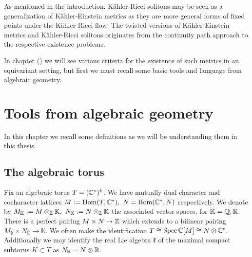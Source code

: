 As mentioned in the introduction, K\"ahler-Ricci solitons may be seen as a generalization of K\"ahler-Einstein metrics as they are more general forms of fixed points under the K\"ahler-Ricci flow. The twisted versions of K\"ahler-Einstein metrics and K\"ahler-Ricci solitons originates from the continuity path approach to the respective existence problems.

In chapter () we will see various criteria for the existence of such metrics in an equivariant setting, but first we must recall some basic tools and language from algebraic geometry.
\section{Tools from algebraic geometry} \label{basics}
In this chapter we recall some definitions as we will be understanding them in this thesis.
\subsection{The algebraic torus} \label{algtorus}
Fix an algebraic torus \(T = (\mathbb{C}^*)^k\). We have mutually dual character and cocharacter lattices \(M := \operatorname{Hom}(T,\mathbb{C}^*), \ N = \operatorname{Hom}(\mathbb{C}^*,N)\) respectively. We denote by \(M_\mathbb{K} := M \otimes_\ZZ \mathbb{K}, \ N_\mathbb{K} := N \otimes_\ZZ \mathbb{K} \) the associated vector spaces, for \(\mathbb{K} = \mathbb{Q}, \mathbb{R}\). There is a perfect pairing \(M \times N \to \mathbb{Z}\) which extends to a bilinear pairing \(M_\mathbb{K} \times N_\mathbb{K} \to \mathbb{K}\). We often make the identification \( T \cong \operatorname{Spec} \mathbb{C}[M] \cong N \otimes \mathbb{C}^*. \) Additionally we may identify the real Lie algebra \(\mathfrak{k}\) of the maximal compact subtorus \(K \subset T\) as \( N_{\mathbb{R}} = N \otimes \mathbb{R}.\)

